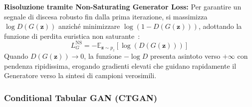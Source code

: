 \begin{table}[H]
\centering
\caption{Intensità del segnale di apprendimento al variare dell'abilità di inganno di $G$.}
\label{tab:dm-gradient-saturation}
\vspace{2mm}
\end{table}

\textbf{Risoluzione tramite Non-Saturating Generator Loss:}
Per garantire un segnale di discesa robusto fin dalla prima iterazione, si massimizza $\log D(G(\mathbf{z}))$ anziché minimizzare $\log(1 - D(G(\mathbf{z})))$, adottando la funzione di perdita euristica non saturante~\cite{goodfellow2014}:
\begin{equation}
    L_G^{\text{NS}} = -\mathbb{E}_{\mathbf{z} \sim p_z}[\log(D(G(\mathbf{z})))]
\end{equation}
Quando $D(G(\mathbf{z})) \to 0$, la funzione $-\log D$ presenta asintoto verso $+\infty$ con pendenza ripidissima, erogando gradienti elevati che guidano rapidamente il Generatore verso la sintesi di campioni verosimili.

\FloatBarrier
\subsubsection{Conditional Tabular GAN (CTGAN)}
\label{subsec:dm-ctgan}

